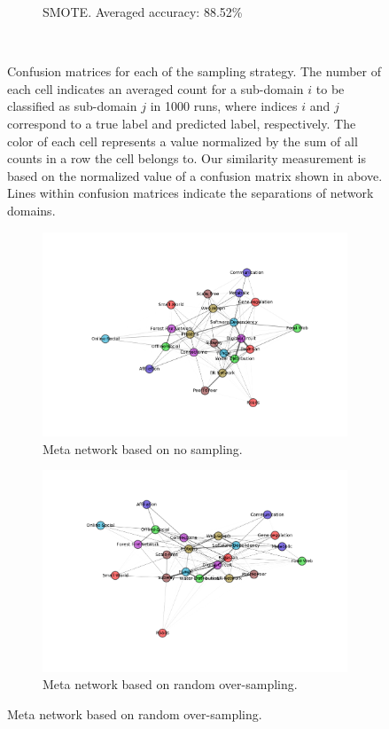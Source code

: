 \documentclass{article}
\begin{document}
\begin{figure}[H]
\begin{subfigure}{0.48\textwidth}
	\caption{SMOTE. Averaged accuracy: 88.52\%} \label{smote_confusion_sub}
	\end{subfigure}
\
\caption{Confusion matrices for each of the sampling strategy. The number of each cell indicates an averaged count for a sub-domain $i$ to be classified as sub-domain $j$ in 1000 runs, where indices $i$ and $j$ correspond to a true label and predicted label, respectively. The color of each cell represents a value normalized by the sum of all counts in a row the cell belongs to. Our similarity measurement is based on the normalized value of a confusion matrix shown in above. Lines within confusion matrices indicate the separations of network domains.} \label{confusion_sub}
\end{figure}

\begin{figure}[H]
	\begin{subfigure}{0.48\textwidth}
	\includegraphics[width=\linewidth]{figs/similarity/SubDomain/None/g.png}
	\caption{Meta network based on no sampling.} \label{no_graph_sub_original}
	\end{subfigure}\hspace*{\fill}
	\begin{subfigure}{0.48\textwidth}
	\includegraphics[width=\linewidth]{figs/similarity/SubDomain/RandomOver/g.png}
	\caption{Meta network based on random over-sampling.} \label{random_over_graph_sub_original}
	\end{subfigure}
	

\end{figure}
\end{document}
